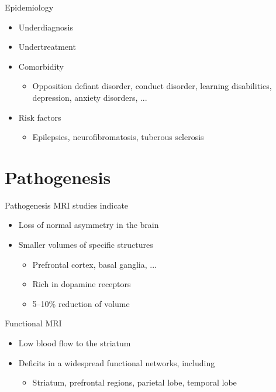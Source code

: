 \documentclass{beamer}
\begin{document}
\begin{frame}{Epidemiology}
\begin{itemize}
    \item Underdiagnosis
    \item Undertreatment
    \item Comorbidity
    \begin{itemize}
        \item Opposition defiant disorder, conduct disorder, learning
            disabilities, depression, anxiety disorders, ...
    \end{itemize}

    \item Risk factors
    \begin{itemize}
        \item Epilepsies, neurofibromatosis, tuberous sclerosis
    \end{itemize}
\end{itemize}
\end{frame}

\section{Pathogenesis}
\begin{frame}{Pathogenesis}
MRI studies indicate

\begin{itemize}
    \item Loss of normal asymmetry in the brain
    \item Smaller volumes of specific structures
    \begin{itemize}
        \item Prefrontal cortex, basal ganglia, ...
        \item Rich in dopamine receptors
        \item 5--10\% reduction of volume
    \end{itemize}
\end{itemize}
\end{frame}

\begin{frame}{Functional MRI}
\begin{itemize}
    \item Low blood flow to the striatum
    \item Deficits in a widespread functional networks, including
    \begin{itemize}
        \item Striatum, prefrontal regions, parietal lobe, temporal lobe
    \end{itemize}
\end{itemize}
\end{frame}
\end{document}
